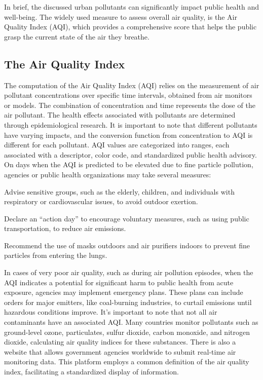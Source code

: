 In brief, the discussed urban pollutants can significantly impact public health and well-being. The widely used measure to assess overall air quality, is the Air Quality Index (AQI), which provides a comprehensive score that helps the public grasp the current state of the air they breathe.

\subsection{The Air Quality Index}

The computation of the Air Quality Index (AQI) relies on the measurement of air pollutant concentrations over specific time intervals, obtained from air monitors or models. The combination of concentration and time represents the dose of the air pollutant. The health effects associated with pollutants are determined through epidemiological research. It is important to note that different pollutants have varying impacts, and the conversion function from concentration to AQI is different for each pollutant. AQI values are categorized into ranges, each associated with a descriptor, color code, and standardized public health advisory.
On days when the AQI is predicted to be elevated due to fine particle pollution, agencies or public health organizations may take several measures:
\begin{compactenum}
    \item Advise sensitive groups, such as the elderly, children, and individuals with respiratory or cardiovascular issues, to avoid outdoor exertion.
    \item Declare an ``action day'' to encourage voluntary measures, such as using public transportation, to reduce air emissions.
    \item Recommend the use of masks outdoors and air purifiers indoors to prevent fine particles from entering the lungs.
\end{compactenum}
In cases of very poor air quality, such as during air pollution episodes, when the AQI indicates a potential for significant harm to public health from acute exposure, agencies may implement emergency plans. These plans can include orders for major emitters, like coal-burning industries, to curtail emissions until hazardous conditions improve.
It's important to note that not all air contaminants have an associated AQI. Many countries monitor pollutants such as ground-level ozone, particulates, sulfur dioxide, carbon monoxide, and nitrogen dioxide, calculating air quality indices for these substances.
There is also a website \cite{Airqualityindexwebsite} that allows government agencies worldwide to submit real-time air monitoring data. This platform employs a common definition of the air quality index, facilitating a standardized display of information.

